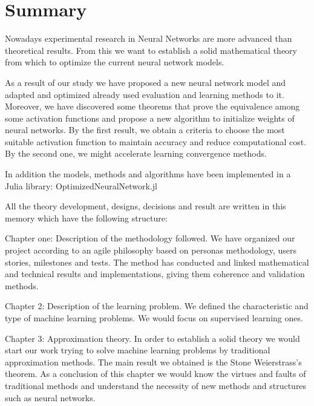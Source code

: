 %

\chapter*{Summary}\label{ch:summary}
Nowadays experimental research in Neural Networks are more advanced than theoretical
results. From this we want to establish a solid mathematical theory from which to optimize the current neural network models. 

As a result of our study we have proposed a new neural network model and adapted and optimized already used evaluation and learning methods to it. Moreover, we have discovered some theorems that prove the equivalence among some activation functions and propose a new algorithm to initialize weights of neural networks. By the first result, we obtain a criteria to choose the most suitable activation function to maintain accuracy and reduce computational cost. By the second one, we might accelerate learning convergence methods.

In addition the models, methods and algorithms have been implemented in a Julia library: 
OptimizedNeuralNetwork.jl 

All the theory development, designs, decisions and result are written in this memory which have the following structure: 

Chapter one: Description of the methodology followed. We have organized our project according to an agile philosophy  based on personas methodology, users stories, milestones and tests. The method has conducted and linked mathematical and technical results and implementations, giving them coherence and validation methods. 

Chapter 2: Description of the learning problem. We defined the characteristic and type of machine learning problems. We would focus on supervised learning ones. 

Chapter 3:  Approximation theory. In order to establish a solid theory we would start our work trying to solve machine learning problems by traditional approximation methods.  The main result we obtained is the Stone Weierstrass’s theorem. As a conclusion of this chapter we would know the virtues and faults of traditional methods and understand the necessity of new methods and structures such as neural networks. 

